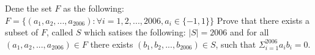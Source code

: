 Dene the set $F$ as the following: $F = \{(a_1,a_2,... , a_{2006}) : \forall i = 1, 2,..., 2006,  a_i \in \{-1,1\}\}$
Prove that there exists a subset of $F$, called $S$ which satises the following:
$|S| = 2006$
and for all $(a_1,a_2,... , a_{2006})\in F$ there exists $(b_1,b_2,... , b_{2006}) \in S$, such that $\Sigma_{i=1} ^{2006}a_ib_i = 0$.